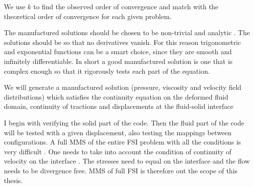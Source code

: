 We use $k$ to find the observed order of convergence and match with the theoretical order of convergence for each given problem.\newline

The manufactured solutions should be chosen to be non-trivial and analytic \cite{Roache2002} \cite{Oberkampf2010}. The solutions should be so that no derivatives vanish. For this reason trigonometric and exponential functions can be a smart choice, since they are smooth and infinitely differentiable. In short a good manufactured solution is one that is complex enough so that it rigorously tests each part of the equation.

We will generate a manufactured solution (pressure, viscosity and velocity field distributions) which satisfies the continuity equation on the deformed fluid domain, continuity of tractions and displacements at the fluid-solid interface


I begin with verifying the solid part of the code. Then the fluid part of the code will be tested with a given displacement, also testing the mappings between configurations. A full MMS of the entire FSI problem with all the conditions is very difficult \cite{Etienne2012}. One needs to take into account the condition of continuity of velocity on the interface \cite{Etienne2006}. The stresses need to equal on the interface and the flow needs to be divergence free. MMS of full FSI is therefore  out the scope of this thesis. 



